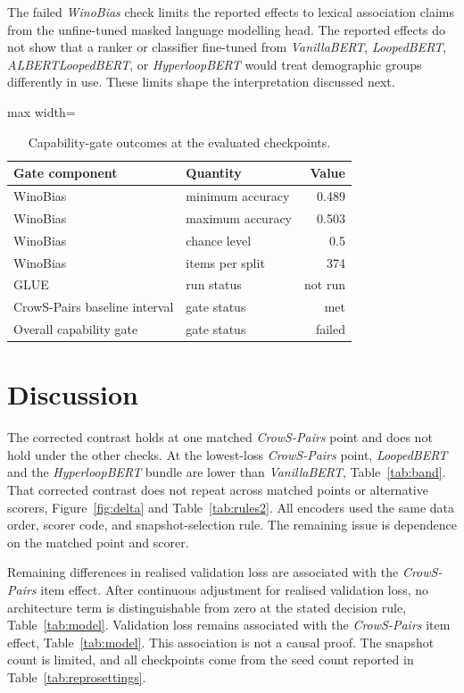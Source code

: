 \documentclass[sigconf,natbib=true,anonymous=true]{acmart}
\begin{document}
The failed \emph{WinoBias} check limits the reported effects to lexical
association claims from the unfine-tuned masked language modelling head. The
reported effects do not show that a ranker or classifier fine-tuned from
\emph{VanillaBERT}, \emph{LoopedBERT}, \emph{ALBERTLoopedBERT}, or
\emph{HyperloopBERT} would treat demographic groups differently in use. These
limits shape the interpretation discussed next.

\begin{table}[t]
\centering
\caption{Capability-gate outcomes at the evaluated checkpoints.}
\label{tab:gate}
\footnotesize
\begin{adjustbox}{max width=\columnwidth}
\begin{tabular}{llr}
\toprule
Gate component & Quantity & Value \\
\midrule
WinoBias & minimum accuracy & 0.489 \\
WinoBias & maximum accuracy & 0.503 \\
WinoBias & chance level & 0.5 \\
WinoBias & items per split & 374 \\
GLUE & run status & not run \\
CrowS-Pairs baseline interval & gate status & met \\
Overall capability gate & gate status & failed \\
\bottomrule
\end{tabular}
\end{adjustbox}
\end{table}

\section{Discussion}
\label{sec:discussion}

The corrected contrast holds at one matched \emph{CrowS-Pairs} point and does
not hold under the other checks. At the lowest-loss \emph{CrowS-Pairs} point,
\emph{LoopedBERT} and the \emph{HyperloopBERT} bundle are lower than
\emph{VanillaBERT}, Table~\ref{tab:band}. That corrected contrast does not
repeat across matched points or alternative scorers, Figure~\ref{fig:delta} and
Table~\ref{tab:rules2}. All encoders used the same data order, scorer code, and
snapshot-selection rule. The remaining issue is dependence on the matched point
and scorer.

Remaining differences in realised validation loss are associated with the
\emph{CrowS-Pairs} item effect. After continuous adjustment for realised
validation loss, no architecture term is distinguishable from zero at the stated
decision rule, Table~\ref{tab:model}. Validation loss remains associated with
the \emph{CrowS-Pairs} item effect, Table~\ref{tab:model}. This association is
not a causal proof. The snapshot count is limited, and all checkpoints come from
the seed count reported in Table~\ref{tab:reprosettings}.
\end{document}
